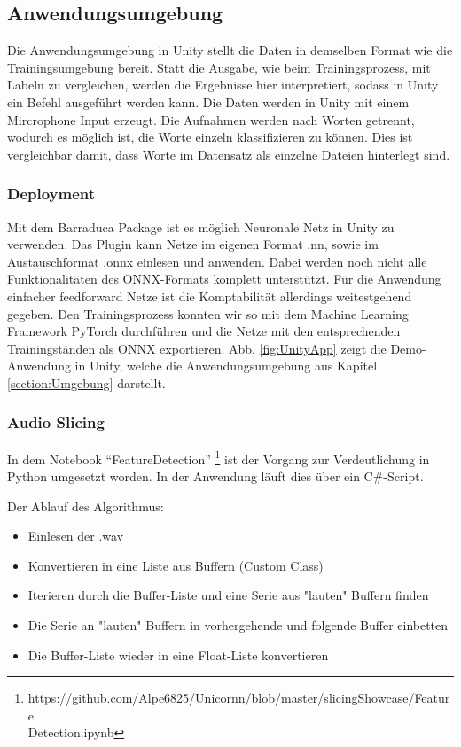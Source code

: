 \documentclass[sigconf]{acmart}
\begin{document}
\subsection{Anwendungsumgebung}
Die Anwendungsumgebung in Unity stellt die Daten in demselben Format wie die Trainingsumgebung bereit. Statt die Ausgabe, wie beim Trainingsprozess,  mit Labeln zu vergleichen, werden die Ergebnisse hier interpretiert, sodass in Unity ein Befehl ausgeführt werden kann. Die Daten werden in Unity mit einem Mircrophone Input erzeugt. Die Aufnahmen werden nach Worten getrennt, wodurch es möglich ist, die Worte einzeln klassifizieren zu können. Dies ist vergleichbar damit, dass Worte im Datensatz als einzelne Dateien hinterlegt sind. 

\subsubsection{Deployment\\}
Mit dem Barraduca Package ist es möglich Neuronale Netz in Unity zu verwenden. Das Plugin kann Netze im eigenen Format .nn, sowie im Austauschformat .onnx einlesen und anwenden. Dabei werden noch nicht alle Funktionalitäten des ONNX-Formats komplett unterstützt. Für die Anwendung einfacher feedforward Netze ist die Komptabilität allerdings weitestgehend gegeben. Den Trainingsprozess konnten wir so mit dem Machine Learning Framework PyTorch durchführen und die Netze mit den entsprechenden Trainingständen als ONNX exportieren. Abb. \ref{fig:UnityApp} zeigt die Demo-Anwendung in Unity, welche die Anwendungsumgebung aus Kapitel \ref{section:Umgebung} darstellt. 

\subsubsection{Audio Slicing\\}
In dem Notebook “FeatureDetection” \footnote[1]{https://github.com/Alpe6825/Unicornn/blob/master/slicingShowcase/Feature\\Detection.ipynb}  ist der Vorgang zur Verdeutlichung  in Python umgesetzt worden. In der Anwendung läuft dies über ein C\#-Script. 

Der Ablauf des Algorithmus: 
\begin{itemize}
\item Einlesen der .wav
\item Konvertieren in eine Liste aus Buffern (Custom Class)
\item Iterieren durch die Buffer-Liste und eine Serie aus "lauten" Buffern finden
\item Die Serie an "lauten" Buffern in vorhergehende und folgende Buffer einbetten
\item Die Buffer-Liste wieder in eine Float-Liste konvertieren
\end{itemize}
\end{document}
